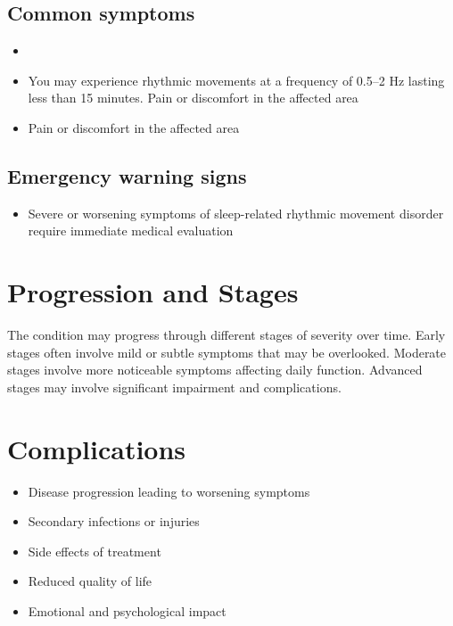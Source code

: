 \subsection{Common symptoms}
\begin{itemize}[noitemsep]
  \item \item You may experience rhythmic movements at a frequency of 0.5--2 Hz lasting less than 15 minutes. Pain or discomfort in the affected area    \item Pain or discomfort in the affected area
  \end{itemize}

\subsection{Emergency warning signs}
\begin{itemize}[noitemsep]
  \item Severe or worsening symptoms of sleep-related rhythmic movement disorder require immediate medical evaluation
\end{itemize}
\section{Progression and Stages}
The condition may progress through different stages of severity over time. Early stages often involve mild or subtle symptoms that may be overlooked. Moderate stages involve more noticeable symptoms affecting daily function. Advanced stages may involve significant impairment and complications.
\section{Complications}
\begin{itemize}[noitemsep]
  \item Disease progression leading to worsening symptoms
  \item Secondary infections or injuries
  \item Side effects of treatment
  \item Reduced quality of life
  \item Emotional and psychological impact
\end{itemize}
